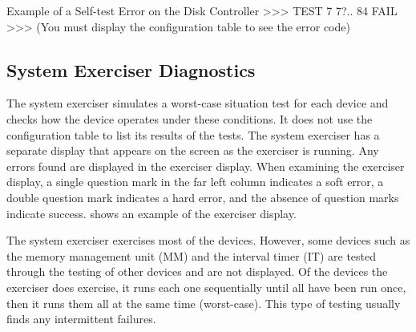 \newpage 
\begin{ttfig}{Example of a Self-test Error on the Disk Controller}
  >>> TEST 7
    7?..
    84 FAIL
  >>>
(You must display the configuration table to see the error code)
\end{ttfig}

\newpage

\subsection{System Exerciser Diagnostics}

The system exerciser simulates a worst-case situation test for each device
and checks how the device operates under these conditions. It does not use
the configuration table to list its results of the tests. The system exerciser
has a separate display that appears on the screen as the exerciser is running.
Any errors found are displayed in the exerciser display. When examining
the exerciser display, a single question mark in the far left column indicates
a soft error, a double question mark indicates a hard error, and the absence
of question marks indicate success.  shows an example of the
exerciser display.

The system exerciser exercises most of the devices. However, some devices
such as the memory management unit (MM) and the interval timer (IT) are
tested through the testing of other devices and are not displayed. Of the
devices the exerciser does exercise, it runs each one sequentially until all
have been run once, then it runs them all at the same time (worst-case).
This type of testing usually finds any intermittent failures.

